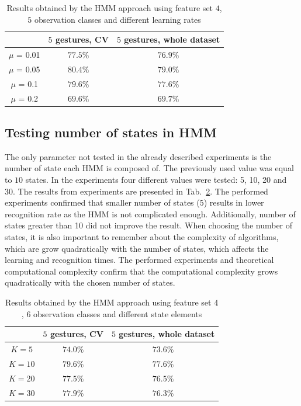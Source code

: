 \begin{table}[htbp!]
\begin{center}
	\label{tab:dyn2}
	\caption{Results obtained by the HMM approach using feature set $4$, $5$ observation classes and different learning rates}
    \begin{tabular}{|c|c|c|}
    \hline
    ~                                 & $5$ gestures, CV & $5$ gestures, whole dataset  \\ \hline
	$\mu$ = 0.01                  	  & $77.5\%$ & $76.9\%$   \\ \hline
    $\mu$ = 0.05                      & $80.4\%$ & $79.0\%$   \\ \hline
    $\mu$ = 0.1                      & $79.6\%$ & $77.6\%$   \\ \hline
    $\mu$ = 0.2                      & $69.6\%$ & $69.7\%$   \\ \hline
    \end{tabular}
\end{center}
\end{table}

\subsection{Testing number of states in HMM}

The only parameter not tested in the already described experiments is the number of state each HMM is composed of. 
The previously used value was equal to $10$ states. 
In the experiments four different values were tested: 5, 10, 20 and 30.
The results from experiments are presented in Tab.~\ref{tab:dyn3}. 
The performed experiments confirmed that smaller number of states ($5$) results in lower recognition rate as the HMM is not complicated enough.
Additionally, number of states greater than 10 did not improve the result.
When choosing the number of states, it is also important to remember about the complexity of algorithms, which are grow quadratically with the number of states, which affects the learning and recognition times. 
The performed experiments and theoretical computational complexity confirm that the computational complexity grows quadratically with the chosen number of states.


\begin{table}[htbp!]
\begin{center}
	\label{tab:dyn3}
	\caption{Results obtained by the HMM approach using feature set $4$, $6$ observation classes and different state elements}
    \begin{tabular}{|c|c|c|}
    \hline
    ~                                 & $5$ gestures, CV & $5$ gestures, whole dataset  \\ \hline
	$K = 5$                  	  & $74.0\%$ & $73.6\%$   \\ \hline
    $K = 10$                     & $79.6\%$ & $77.6\%$   \\ \hline
    $K = 20$                    & $77.5\%$ & $76.5\%$   \\ \hline
    $K = 30$                     & $77.9\%$ & $76.3\%$   \\ \hline
    \end{tabular}
\end{center}
\end{table}